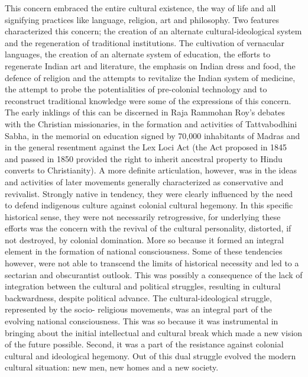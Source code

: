 This concern embraced the entire cultural existence, the way of life and all signifying practices like language, religion, art and philosophy. Two features characterized this concern; the creation of an alternate cultural-ideological system and the regeneration of traditional institutions. The cultivation of vernacular languages, the creation of an alternate system of education, the efforts to regenerate Indian art and literature, the emphasis on Indian dress and food, the defence of religion and the attempts to revitalize the Indian system of medicine, the attempt to probe the potentialities of pre-colonial technology and to reconstruct traditional knowledge were some of the expressions of this concern. The early inklings of this can be discerned in Raja Rammohan Roy's debates with the Christian missionaries, in the formation and activities of Tattvabodhini Sabha, in the memorial on education signed by 70,000 inhabitants of Madras and in the general resentment against the Lex Loci Act (the Act proposed in 1845 and passed in 1850 provided the right to inherit ancestral property to Hindu converts to Christianity). A more definite articulation, however, was in the ideas and activities of later movements generally characterized as conservative and revivalist. Strongly native in tendency, they were clearly influenced by the need to defend indigenous culture against colonial cultural hegemony. In this specific historical sense, they were not necessarily retrogressive, for underlying these efforts was the concern with the revival of the cultural personality, distorted, if not destroyed, by colonial domination. More so because it formed an integral element in the formation of national consciousness. Some of these tendencies however, were not able to transcend the limits of historical necessity and led to a sectarian and obscurantist outlook. This was possibly a consequence of the lack of integration between the cultural and political struggles, resulting in cultural backwardness, despite political advance. The cultural-ideological struggle, represented by the socio- religious movements, was an integral part of the evolving national consciousness. This was so because it was instrumental in bringing about the initial intellectual and cultural break which made a new vision of the future possible. Second, it was a part of the resistance against colonial cultural and ideological hegemony. Out of this dual struggle evolved the modern cultural situation: new men, new homes and a new society.

